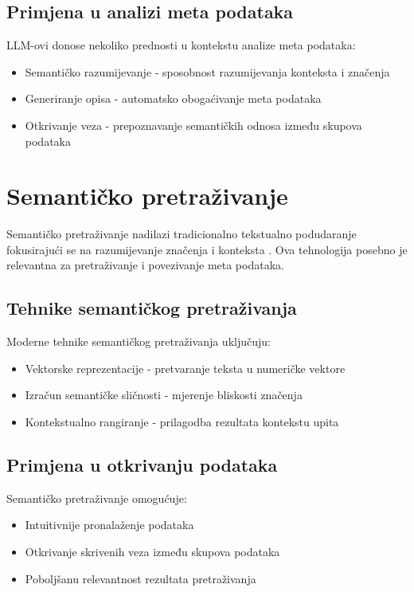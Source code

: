 \subsection{Primjena u analizi meta podataka}
LLM-ovi donose nekoliko prednosti u kontekstu analize meta podataka:
\begin{itemize}
    \item Semantičko razumijevanje - sposobnost razumijevanja konteksta i značenja
    \item Generiranje opisa - automatsko obogaćivanje meta podataka
    \item Otkrivanje veza - prepoznavanje semantičkih odnosa između skupova podataka
\end{itemize}

\section{Semantičko pretraživanje}
\label{sec:semantic_search}

Semantičko pretraživanje nadilazi tradicionalno tekstualno podudaranje fokusirajući se 
na razumijevanje značenja i konteksta \cite{zhang2022survey}. Ova tehnologija posebno 
je relevantna za pretraživanje i povezivanje meta podataka.

\subsection{Tehnike semantičkog pretraživanja}
Moderne tehnike semantičkog pretraživanja uključuju:
\begin{itemize}
    \item Vektorske reprezentacije - pretvaranje teksta u numeričke vektore
    \item Izračun semantičke sličnosti - mjerenje bliskosti značenja
    \item Kontekstualno rangiranje - prilagodba rezultata kontekstu upita
\end{itemize}

\subsection{Primjena u otkrivanju podataka}
Semantičko pretraživanje omogućuje:
\begin{itemize}
    \item Intuitivnije pronalaženje podataka
    \item Otkrivanje skrivenih veza između skupova podataka
    \item Poboljšanu relevantnost rezultata pretraživanja
\end{itemize}

